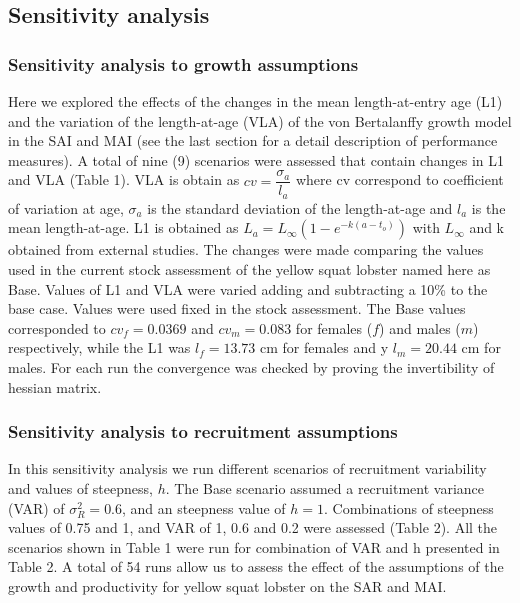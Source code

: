 \documentclass[11pt,letterpaper,]{article}
\begin{document}
\subsection{Sensitivity analysis}\label{sensitivity-analysis}

\subsubsection{Sensitivity analysis to growth
assumptions}\label{sensitivity-analysis-to-growth-assumptions}

Here we explored the effects of the changes in the mean length-at-entry
age (L1) and the variation of the length-at-age (VLA) of the von
Bertalanffy growth model in the SAI and MAI (see the last section for a
detail description of performance measures). A total of nine (9)
scenarios were assessed that contain changes in L1 and VLA (Table 1).
VLA is obtain as \(cv=\dfrac{\sigma_a}{l_a}\) where cv correspond to
coefficient of variation at age, \(\sigma_a\) is the standard deviation
of the length-at-age and \(l_a\) is the mean length-at-age. L1 is
obtained as \(L_a=L_\infty( 1-e^{-k(a-t_o)})\) with \(L_\infty\) and k
obtained from external studies. The changes were made comparing the
values used in the current stock assessment of the yellow squat lobster
named here as Base. Values of L1 and VLA were varied adding and
subtracting a 10\% to the base case. Values were used fixed in the stock
assessment. The Base values corresponded to \(cv_f=0.0369\) and
\(cv_m=0.083\) for females (\(f\)) and males (\(m\)) respectively, while
the L1 was \(l_f=13.73\) cm for females and y \(l_m=20.44\) cm for
males. For each run the convergence was checked by proving the
invertibility of hessian matrix.

\subsubsection{Sensitivity analysis to recruitment
assumptions}\label{sensitivity-analysis-to-recruitment-assumptions}

In this sensitivity analysis we run different scenarios of recruitment
variability and values of steepness, \(h\). The Base scenario assumed a
recruitment variance (VAR) of \(\sigma^2_R=0.6\), and an steepness value
of \(h=1\). Combinations of steepness values of 0.75 and 1, and VAR of
1, 0.6 and 0.2 were assessed (Table 2). All the scenarios shown in Table
1 were run for combination of VAR and h presented in Table 2. A total of
54 runs allow us to assess the effect of the assumptions of the growth
and productivity for yellow squat lobster on the SAR and MAI.
\end{document}
